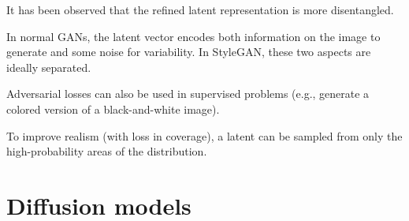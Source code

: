 \begin{description}
        \begin{remark}
            It has been observed that the refined latent representation is more disentangled.
        \end{remark}

        \begin{remark}
            In normal GANs, the latent vector encodes both information on the image to generate and some noise for variability. In StyleGAN, these two aspects are ideally separated.
        \end{remark}
\end{description}

\begin{remark}
    Adversarial losses can also be used in supervised problems (e.g., generate a colored version of a black-and-white image).
\end{remark}

\begin{remark}[BigGAN] 
    To improve realism (with loss in coverage), a latent can be sampled from only the high-probability areas of the distribution.
\end{remark}



\section{Diffusion models}

\def\x{\matr{x}}
\def\params{\matr{\theta}}
\def\noise{\matr{\varepsilon}}


